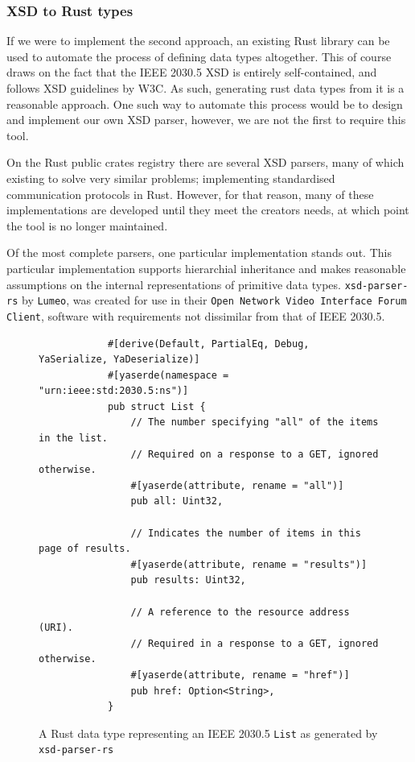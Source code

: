 \subsubsection{XSD to Rust types}

If we were to implement the second approach, an existing Rust library can be used to automate the process of defining data types altogether.
This of course draws on the fact that the IEEE 2030.5 XSD is entirely self-contained, and follows XSD guidelines by W3C. As such, generating rust data types from it is a reasonable approach.
One such way to automate this process would be to design and implement our own XSD parser, however, we are not the first to require this tool. 

On the Rust public crates registry there are several XSD parsers, many of which existing to solve very similar problems; implementing standardised communication protocols in Rust.
However, for that reason, many of these implementations are developed until they meet the creators needs, at which point the tool is no longer maintained.

Of the most complete parsers, one particular implementation stands out. This particular implementation supports hierarchial inheritance and makes reasonable assumptions on the internal representations of primitive data types.
\texttt{xsd-parser-rs} by \texttt{Lumeo}, was created for use in their \texttt{Open Network Video Interface Forum Client}, software with requirements not dissimilar from that of IEEE 2030.5.

\begin{figure}[H]
    \begin{center}
        \begin{lstlisting}
            #[derive(Default, PartialEq, Debug, YaSerialize, YaDeserialize)]
            #[yaserde(namespace = "urn:ieee:std:2030.5:ns")]
            pub struct List {
                // The number specifying "all" of the items in the list. 
                // Required on a response to a GET, ignored otherwise.
                #[yaserde(attribute, rename = "all")]
                pub all: Uint32,
            
                // Indicates the number of items in this page of results.
                #[yaserde(attribute, rename = "results")]
                pub results: Uint32,
            
                // A reference to the resource address (URI). 
                // Required in a response to a GET, ignored otherwise.
                #[yaserde(attribute, rename = "href")]
                pub href: Option<String>,
            }
        \end{lstlisting}
        \label{fig:listauto}
        \caption{A Rust data type representing an IEEE 2030.5 \texttt{List} as generated by \texttt{xsd-parser-rs}}
    \end{center}
\end{figure}

